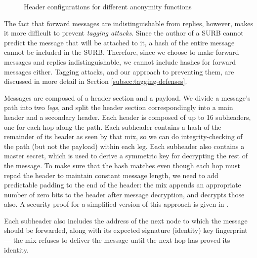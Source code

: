 \documentclass[final]{ieee}
\begin{document}
\begin{figure}
\begin{center}
\caption{Header configurations for different anonymity functions} 
\end{center}
\end{figure}

The fact that forward messages are indistinguishable from replies,
however, makes it more difficult to prevent \emph{tagging attacks}.
Since the author of a SURB cannot predict the message that will be
attached to it, a hash of the entire message cannot be included in
the SURB.
Therefore, since we choose to make forward messages and replies
indistinguishable, we cannot include hashes for forward messages either.
Tagging attacks, and our approach to preventing them, are discussed in more
detail in Section \ref{subsec:tagging-defenses}.

Messages are composed of a header section and a payload. We divide
a message's path into two \emph{legs}, and split the header section
correspondingly into a main header and a secondary header. Each header
is composed of up to 16 subheaders, one for each hop along the path.
Each subheader contains a hash of the remainder of its header as seen
by that mix, so we can do integrity-checking of the path (but not the
payload) within each leg. Each subheader also contains a master secret,
which is used to derive a symmetric key for decrypting the rest of the
message. To make sure that the hash matches even though each hop
must repad the header to maintain constant message length, we need to
add predictable padding to the end of the header: the mix appends an
appropriate number of zero bits to the header after message decryption,
and decrypts those also. A security proof for a simplified version of
this approach is given in \cite{BM:mixencrypt}.

Each subheader also includes the address of the next node to which
the message should be forwarded, along with its expected signature
(identity) key
fingerprint --- the mix refuses to deliver the message until the next
hop has proved its identity.
\end{document}

